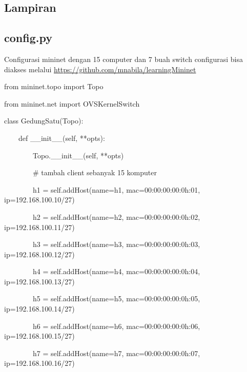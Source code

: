 \begin{center}
\section{Lampiran}
\end{center}
\subsection{config.py}
Configurasi mininet dengan 15 computer dan 7 buah switch
configurasi bisa diakses melalui \url{https://github.com/mnabila/learningMininet}

from mininet.topo import Topo

from mininet.net import OVSKernelSwitch

\bigskip

class GedungSatu(Topo):

\ \ \ \ def \_\_init\_\_(self, **opts):

\ \ \ \ \ \ \ \ Topo.\_\_init\_\_(self, **opts)

\bigskip

\ \ \ \ \ \ \ \ \# tambah client sebanyak 15 komputer

\ \ \ \ \ \ \ \ h1 = self.addHost(name={\textquotedbl}h1{\textquotedbl},
mac={\textquotedbl}00:00:00:00:0h:01{\textquotedbl}, ip={\textquotedbl}192.168.100.10/27{\textquotedbl})

\ \ \ \ \ \ \ \ h2 = self.addHost(name={\textquotedbl}h2{\textquotedbl},
mac={\textquotedbl}00:00:00:00:0h:02{\textquotedbl}, ip={\textquotedbl}192.168.100.11/27{\textquotedbl})

\ \ \ \ \ \ \ \ h3 = self.addHost(name={\textquotedbl}h3{\textquotedbl},
mac={\textquotedbl}00:00:00:00:0h:03{\textquotedbl}, ip={\textquotedbl}192.168.100.12/27{\textquotedbl})

\ \ \ \ \ \ \ \ h4 = self.addHost(name={\textquotedbl}h4{\textquotedbl},
mac={\textquotedbl}00:00:00:00:0h:04{\textquotedbl}, ip={\textquotedbl}192.168.100.13/27{\textquotedbl})

\ \ \ \ \ \ \ \ h5 = self.addHost(name={\textquotedbl}h5{\textquotedbl},
mac={\textquotedbl}00:00:00:00:0h:05{\textquotedbl}, ip={\textquotedbl}192.168.100.14/27{\textquotedbl})

\ \ \ \ \ \ \ \ h6 = self.addHost(name={\textquotedbl}h6{\textquotedbl},
mac={\textquotedbl}00:00:00:00:0h:06{\textquotedbl}, ip={\textquotedbl}192.168.100.15/27{\textquotedbl})

\ \ \ \ \ \ \ \ h7 = self.addHost(name={\textquotedbl}h7{\textquotedbl},
mac={\textquotedbl}00:00:00:00:0h:07{\textquotedbl}, ip={\textquotedbl}192.168.100.16/27{\textquotedbl})

